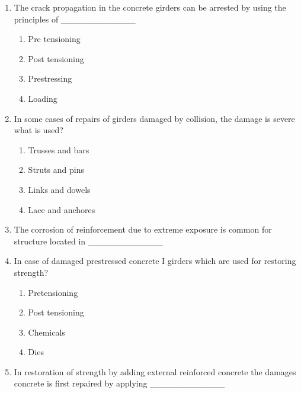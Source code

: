 \documentclass[11pt,a4paper]{article}
\begin{document}
\begin{enumerate}
\item{The crack propagation in the concrete girders can be arrested by using the principles of \_\_\_\_\_\_\_\_\_\_\_\_}
\begin{enumerate}[label=\Alph*.]
\item{Pre tensioning}
\item{Post tensioning}
\item{Prestressing}
\item{Loading}
\end{enumerate}
\item{In some cases of repairs of girders damaged by collision, the damage is severe what is used?}
\begin{enumerate}[label=\Alph*.]
\item{Trusses and bars}
\item{Struts and pins}
\item{Links and dowels}
\item{Lace and anchores}
\end{enumerate}
\item{The corrosion of reinforcement due to extreme exposure is common for structure located in \_\_\_\_\_\_\_\_\_\_\_\_}
\\
\item{In case of damaged prestressed concrete I girders which are used for restoring strength?}
\begin{enumerate}[label=\Alph*.]
\item{Pretensioning}
\item{Post tensioning}
\item{Chemicals}
\item{Dies}
\end{enumerate}
\item{In restoration of strength by adding external reinforced concrete the damages concrete is first repaired by applying \_\_\_\_\_\_\_\_\_\_\_\_}

\end{enumerate}
\end{document}
